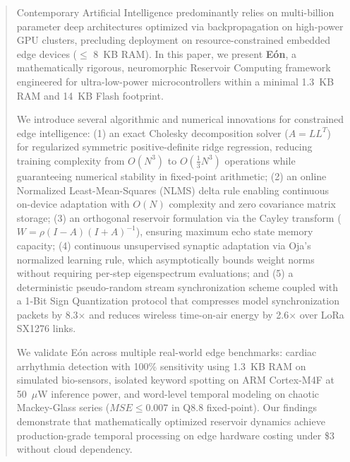 \begin{abstract}
Contemporary Artificial Intelligence predominantly relies on multi-billion parameter deep architectures optimized via backpropagation on high-power GPU clusters, precluding deployment on resource-constrained embedded edge devices ($\le$ 8~KB RAM). In this paper, we present \textbf{Eón}, a mathematically rigorous, neuromorphic Reservoir Computing framework engineered for ultra-low-power microcontrollers within a minimal 1.3~KB RAM and 14~KB Flash footprint. 

We introduce several algorithmic and numerical innovations for constrained edge intelligence: (1) an exact Cholesky decomposition solver ($A = L L^T$) for regularized symmetric positive-definite ridge regression, reducing training complexity from $O(N^3)$ to $O(\frac{1}{3} N^3)$ operations while guaranteeing numerical stability in fixed-point arithmetic; (2) an online Normalized Least-Mean-Squares (NLMS) delta rule enabling continuous on-device adaptation with $O(N)$ complexity and zero covariance matrix storage; (3) an orthogonal reservoir formulation via the Cayley transform ($W = \rho (I - A)(I + A)^{-1}$), ensuring maximum echo state memory capacity; (4) continuous unsupervised synaptic adaptation via Oja's normalized learning rule, which asymptotically bounds weight norms without requiring per-step eigenspectrum evaluations; and (5) a deterministic pseudo-random stream synchronization scheme coupled with a 1-Bit Sign Quantization protocol that compresses model synchronization packets by 8.3$\times$ and reduces wireless time-on-air energy by 2.6$\times$ over LoRa SX1276 links.

We validate Eón across multiple real-world edge benchmarks: cardiac arrhythmia detection with 100\% sensitivity using 1.3~KB RAM on simulated bio-sensors, isolated keyword spotting on ARM Cortex-M4F at 50~$\mu$W inference power, and word-level temporal modeling on chaotic Mackey-Glass series ($MSE \le 0.007$ in Q8.8 fixed-point). Our findings demonstrate that mathematically optimized reservoir dynamics achieve production-grade temporal processing on edge hardware costing under \$3 without cloud dependency.
\end{abstract}
